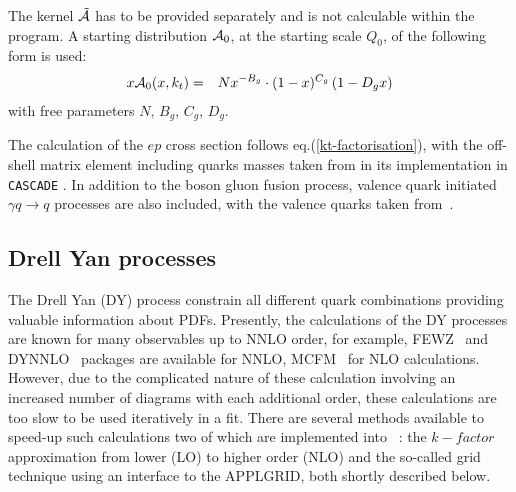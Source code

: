 The kernel ${\cal \tilde A}$ has to be provided separately and is not
 calculable within the program. A starting distribution  ${\cal A}_0$, 
 at the starting scale $Q_0$, of the following form is used:
\begin{eqnarray}
x{\cal A}_0(x,\kt) &=& N x^{-B_g} \cdot (1 -x)^{C_g}\left( 1 -D_g x\right) 
\label{a0}
\end{eqnarray}
with free parameters $N,\, B_g,\, C_g,\, D_g$. 

The calculation of the $ep$ cross section follows eq.(\ref{kt-factorisation}), 
with the off-shell matrix element including quarks masses taken from \cite{Catani:1990eg} 
in its implementation in {\tt CASCADE} \cite{Jung:2010si}.
In addition to the boson gluon fusion process, valence quark initiated 
$\gamma q\to q$ processes are also included, with the valence quarks taken from~\cite{Deak:2010gk}.


\subsection{Drell Yan processes}
\label{dysection}

The Drell Yan (DY) process constrain all different quark combinations
providing valuable information about PDFs.
%
Presently, the calculations of the DY processes are known for many observables up to 
NNLO order, for example, FEWZ~\cite{FEWZ} and DYNNLO~\cite{DYNNLO} packages are available
for NNLO, MCFM~\cite{MCFM} for NLO calculations. However, due to the complicated 
nature of these calculation involving an increased number of diagrams with each 
additional order, these calculations are too slow to be used iteratively in a fit.
There are several methods available to speed-up such calculations two of which 
are implemented into \fitter\ : the $k-factor$ approximation from lower (LO) to higher order (NLO) 
and the so-called grid technique using an interface to the APPLGRID, both shortly
described below.  

